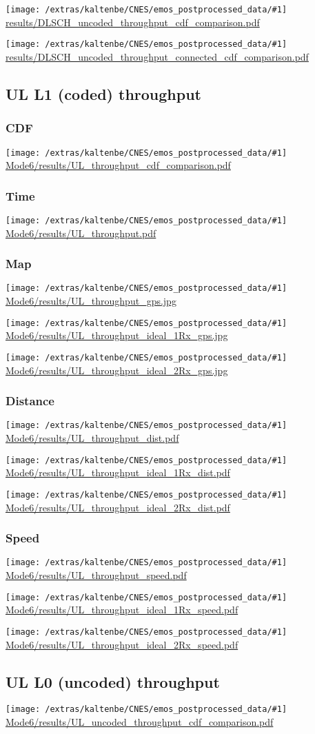 \documentclass[a4paper,10pt]{article}
\newcommand{\printfile}[1]{
 \begin{minipage}{8cm}
  \centering
  \texttt{[image: /extras/kaltenbe/CNES/emos\_postprocessed\_data/\#1]}
  \url{#1}

 \end{minipage}
}
\begin{document}
\printfile{results/DLSCH_uncoded_throughput_cdf_comparison.pdf}
\printfile{results/DLSCH_uncoded_throughput_connected_cdf_comparison.pdf}

\subsection{UL L1 (coded) throughput}

\subsubsection{CDF}
\printfile{Mode6/results/UL_throughput_cdf_comparison.pdf}

\subsubsection{Time}
\printfile{Mode6/results/UL_throughput.pdf}

\subsubsection{Map}
\printfile{Mode6/results/UL_throughput_gps.jpg}

\printfile{Mode6/results/UL_throughput_ideal_1Rx_gps.jpg}
\printfile{Mode6/results/UL_throughput_ideal_2Rx_gps.jpg}

\subsubsection{Distance}
\printfile{Mode6/results/UL_throughput_dist.pdf}

\printfile{Mode6/results/UL_throughput_ideal_1Rx_dist.pdf}
\printfile{Mode6/results/UL_throughput_ideal_2Rx_dist.pdf}


\subsubsection{Speed}
\printfile{Mode6/results/UL_throughput_speed.pdf}

\printfile{Mode6/results/UL_throughput_ideal_1Rx_speed.pdf}
\printfile{Mode6/results/UL_throughput_ideal_2Rx_speed.pdf}



\subsection{UL L0 (uncoded) throughput}

\printfile{Mode6/results/UL_uncoded_throughput_cdf_comparison.pdf}
\end{document}
